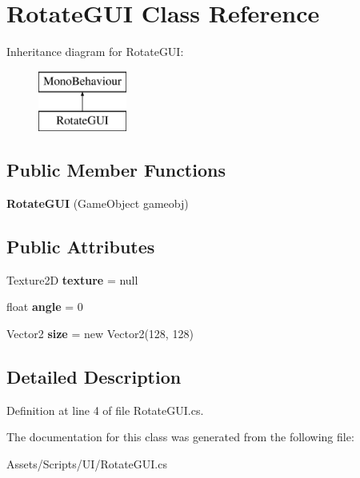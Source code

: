 \hypertarget{class_rotate_g_u_i}{\section{Rotate\+G\+U\+I Class Reference}
\label{class_rotate_g_u_i}
}
Inheritance diagram for Rotate\+G\+U\+I\+:\begin{figure}[H]
\begin{center}
\leavevmode
\includegraphics[height=2.000000cm]{class_rotate_g_u_i}
\end{center}
\end{figure}
\subsection*{Public Member Functions}
\begin{DoxyCompactItemize}
\item 
\hypertarget{class_rotate_g_u_i_ae8e7588323f5a87a6bf5bf17aa467a9c}{{\bfseries Rotate\+G\+U\+I} (Game\+Object gameobj)}\label{class_rotate_g_u_i_ae8e7588323f5a87a6bf5bf17aa467a9c}

\end{DoxyCompactItemize}
\subsection*{Public Attributes}
\begin{DoxyCompactItemize}
\item 
\hypertarget{class_rotate_g_u_i_a99ba2952cb01bdf28171f04f3f339683}{Texture2\+D {\bfseries texture} = null}\label{class_rotate_g_u_i_a99ba2952cb01bdf28171f04f3f339683}

\item 
\hypertarget{class_rotate_g_u_i_a018bfaff1e804ba93d39c81b142f2f6b}{float {\bfseries angle} = 0}\label{class_rotate_g_u_i_a018bfaff1e804ba93d39c81b142f2f6b}

\item 
\hypertarget{class_rotate_g_u_i_a75558c35bc8468bcbb21fcb488a5de4a}{Vector2 {\bfseries size} = new Vector2(128, 128)}\label{class_rotate_g_u_i_a75558c35bc8468bcbb21fcb488a5de4a}

\end{DoxyCompactItemize}


\subsection{Detailed Description}


Definition at line 4 of file Rotate\+G\+U\+I.\+cs.



The documentation for this class was generated from the following file\+:\begin{DoxyCompactItemize}
\item 
Assets/\+Scripts/\+U\+I/Rotate\+G\+U\+I.\+cs\end{DoxyCompactItemize}
